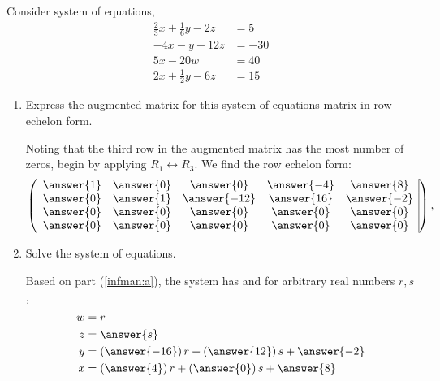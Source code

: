 \documentclass{ximera}
\author{Parisa Fatheddin}
\begin{document}
\begin{exercise} Consider system of equations,
\begin{align*}
\frac{2}{3}x + \frac{1}{6}y -2z &= 5\\
-4x -y+12z &= -30\\
5x-20w &= 40\\
2x+\frac{1}{2} y - 6z &= 15
\end{align*}

\begin{enumerate}
\item\label{infman:a} Express the augmented matrix for this system of equations matrix
  in row echelon form.
\begin{prompt}
Noting that the third row in the augmented matrix has the most number
of zeros, begin by applying $R_{1}\leftrightarrow R_{3}$. We find the
row echelon form:
\[
\left(\begin{array}{ccccc|c}
  \answer{1} &  \answer{0} & \answer{0} & \answer{-4} &\answer{8} \\
  \answer{0} &  \answer{1} & \answer{-12} & \answer{16} &\answer{-2}\\
  \answer{0} &  \answer{0} & \answer{0} & \answer{0} &\answer{0}\\
  \answer{0} &  \answer{0} & \answer{0} & \answer{0} &\answer{0}
\end{array}\right),
\]
\end{prompt}
\item Solve the system of equations. 
\begin{prompt}
Based on part (\ref{infman:a}), the system has  and for arbitrary real numbers $r,s$,
\begin{align*}
w&= r\\
z &= \answer{s}\\
y &= \left(\answer{-16}\right)r + \left(\answer{12}\right)s + \answer{-2}\\
x&= \left(\answer{4}\right) r + \left(\answer{0}\right)s + \answer{8}
\end{align*}
\end{prompt}
\end{enumerate}
\end{exercise}
\end{document}
